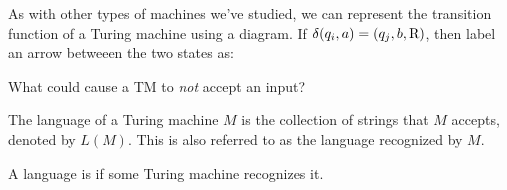 \documentclass[twoside,letterpaper,openany]{book}
\begin{document}
\begin{discussion}
As with other types of machines we've studied, we can represent the transition function of a Turing machine using a diagram. If $\delta(q_i, a) = (q_j, b, \textrm{R})$, then label an arrow betweeen the two states as:
\begin{center}
\end{center}
\end{discussion}

\begin{exer}
What could cause a TM to \emph{not} accept an input?
\end{exer}

\begin{defn}
The language of a Turing machine $M$ is the collection of strings that $M$ accepts, denoted by $L(M)$. This is also referred to as the language recognized by $M$.
\end{defn}

\begin{defn}
A language is  if some Turing machine recognizes it.
\end{defn}
\end{document}
